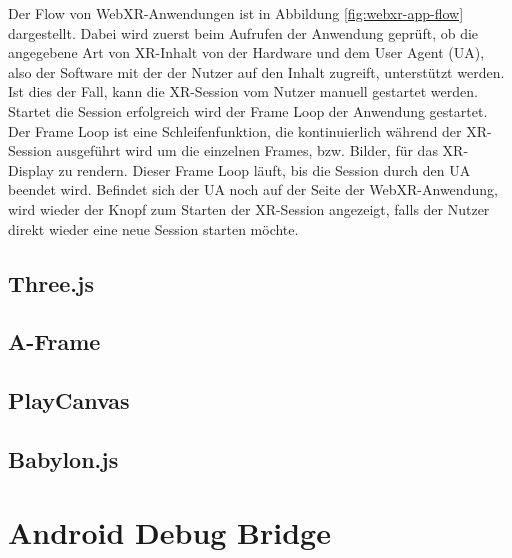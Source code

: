 Der Flow von WebXR-Anwendungen ist in Abbildung \ref{fig:webxr-app-flow} dargestellt.
Dabei wird zuerst beim Aufrufen der Anwendung geprüft, ob die angegebene Art von XR-Inhalt von der Hardware und dem User Agent (UA), also der Software mit der der Nutzer auf den Inhalt zugreift, unterstützt werden.
Ist dies der Fall, kann die XR-Session vom Nutzer manuell gestartet werden.
Startet die Session erfolgreich wird der Frame Loop der Anwendung gestartet.
Der Frame Loop ist eine Schleifenfunktion, die kontinuierlich während der XR-Session ausgeführt wird um die einzelnen Frames, bzw. Bilder, für das XR-Display zu rendern.
Dieser Frame Loop läuft, bis die Session durch den UA beendet wird.
Befindet sich der UA noch auf der Seite der WebXR-Anwendung, wird wieder der Knopf zum Starten der XR-Session angezeigt, falls der Nutzer direkt wieder eine neue Session starten möchte.

\subsection{Three.js}

\subsection{A-Frame}

\subsection{PlayCanvas}

\subsection{Babylon.js}

\section{Android Debug Bridge}